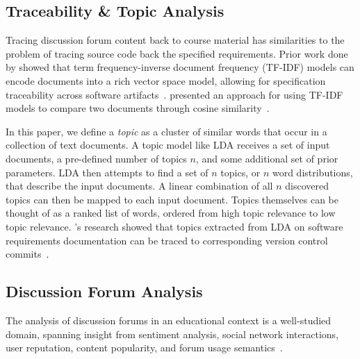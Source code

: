 \documentclass[sigconf, anonymous]{acmart}
\begin{document}
\subsection{Traceability \& Topic Analysis}
Tracing discussion forum content back to course material has similarities to the problem of tracing source code back the specified requirements.
Prior work done by \citeauthor{4556122} showed that term frequency-inverse document frequency (TF-IDF) models can encode documents into a rich vector space model, allowing for specification traceability across software artifacts~\cite{4556122}.
\citeauthor{Tata:2007:EST:1328854.1328855} presented an approach for using TF-IDF models to compare two documents through cosine similarity~\cite{Tata:2007:EST:1328854.1328855}.

In this paper, we define a \textit{topic} as a cluster of similar words that occur in a collection of text documents.
A topic model like LDA receives a set of input documents, a pre-defined number of topics $n$, and some additional set of prior parameters.
LDA then attempts to find a set of $n$ topics, or $n$ word distributions, that describe the input documents.
A linear combination of all $n$ discovered topics can then be mapped to each input document.
Topics themselves can be thought of as a ranked list of words, ordered from high topic relevance to low topic relevance.
\citeauthor{hindle2012relating}'s research showed that topics extracted from LDA on software requirements documentation can be traced to corresponding version control commits~\cite{hindle2012relating}.

\subsection{Discussion Forum Analysis}
The analysis of discussion forums in an educational context is a well-studied domain, spanning insight from sentiment analysis, social network interactions, user reputation, content popularity, and forum usage semantics~\cite{wen2014sentiment,wong2015analysis,coetzee2014should,breslow2013studying,onah2014exploring}.
\end{document}

